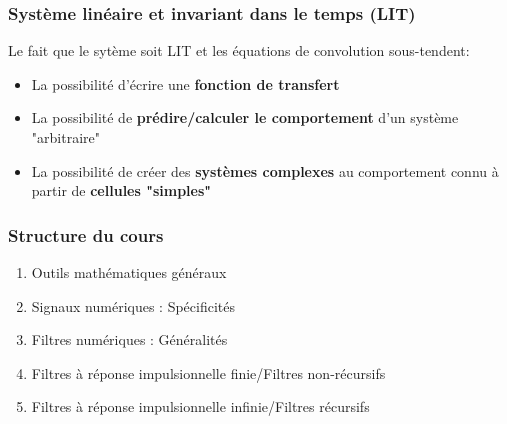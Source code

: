 \documentclass{beamer}
\begin{document}
\begin{frame}
\frametitle{Système linéaire et invariant dans le temps (LIT)}
Le fait que le sytème soit LIT et les équations de convolution sous-tendent: \\
\vspace{1cm}
\begin{itemize}
\item La possibilité d'écrire une \textbf{fonction de transfert}
\vspace{0.3cm}
\item La possibilité de \textbf{prédire/calculer le comportement} d'un système "arbitraire"
\vspace{0.3cm}
\item La possibilité de créer des \textbf{systèmes complexes} au comportement connu à partir de \textbf{cellules "simples"}
\end{itemize}

\end{frame} 

\begin{frame} 
\frametitle{Structure du cours}
\begin{enumerate}
\item Outils mathématiques généraux  
\item Signaux numériques : Spécificités 
\item Filtres numériques : Généralités 
\item Filtres à réponse impulsionnelle finie/Filtres non-récursifs 
\item Filtres à réponse impulsionnelle infinie/Filtres récursifs 
\end{enumerate}
\end{frame} 
\end{document}
